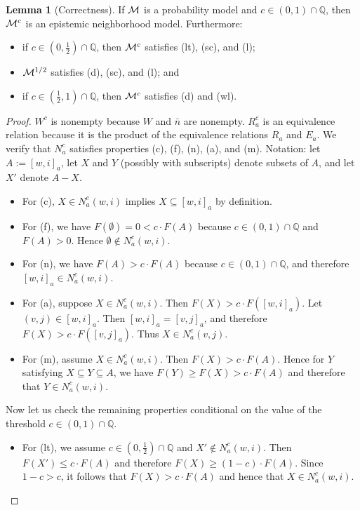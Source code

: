\documentclass[12pt]{article}
\theoremstyle{definition}
\newtheorem{lemma}[theorem]{Lemma}
\newcommand{\Rat}{\mathbb{Q}}  %
\newcommand{\M}{{\cal M}}      %
\begin{document}
\begin{lemma}[Correctness]
  \label{lemma:correctness}
  If $\M$ is a probability model and $c\in(0,1)\cap\Rat$, then $\M^c$
  is an epistemic neighborhood model.  Furthermore:
  \begin{itemize}
  \item if $c\in(0,\frac 12)\cap\Rat$, then $\M^c$ satisfies (lt),
    (sc), and (l);

  \item $\M^{1/2}$ satisfies (d), (sc), and (l); and

  \item if $c\in(\frac 12,1)\cap\Rat$, then $\M^c$ satisfies (d) and
    (wl).
  \end{itemize}
\end{lemma}
\begin{proof}
  $W^c$ is nonempty because $W$ and $\bar{n}$ are nonempty.  $R^c_a$
  is an equivalence relation because it is the product of the
  equivalence relations $R_a$ and $E_a$.  We verify that $N^c_a$
  satisfies properties (c), (f), (n), (a), and (m).  Notation: let
  $A:=[w,i]_a$, let $X$ and $Y$ (possibly with subscripts) denote
  subsets of $A$, and let $X'$ denote $A-X$.
  \begin{itemize}
  \item For (c), $X\in N^c_a(w,i)$ implies $X\subseteq[w,i]_a$ by
    definition.

  \item For (f), we have $F(\emptyset)=0<c\cdot F(A)$ because
    $c\in(0,1)\cap\Rat$ and $F(A)>0$.  Hence $\emptyset\notin
    N^c_a(w,i)$.

  \item For (n), we have $F(A) > c\cdot F(A)$ because
    $c\in(0,1)\cap\Rat$, and therefore $[w,i]_a \in N^c_a(w,i)$.

  \item For (a), suppose $X \in N^c_a(w,i)$. Then $F(X) > c\cdot
    F([w,i]_a)$.  Let $(v,j) \in [w,i]_a$. Then $[w,i]_a = [v,j]_a$,
    and therefore $F(X) > c\cdot F([v,j]_a)$. Thus $X \in N^c_a(v,j)$.

  \item For (m), assume $X \in N^c_a(w,i)$.  Then $F(X) > c\cdot
    F(A)$. Hence for $Y$ satisfying $X \subseteq Y \subseteq A$, we
    have $F(Y) \geq F(X) > c\cdot F(A)$ and therefore that $Y \in
    N^c_a(w,i)$.
  \end{itemize}
  Now let us check the remaining properties conditional on the value
  of the threshold $c\in(0,1)\cap\Rat$.
  \begin{itemize}
  \item For (lt), we assume $c\in(0,\frac 12)\cap\Rat$ and $X'\notin
    N^c_a(w,i)$.  Then $F(X')\leq c\cdot F(A)$ and therefore $F(X)\geq
    (1-c)\cdot F(A)$.  Since $1-c>c$, it follows that $F(X)> c\cdot
    F(A)$ and hence that $X\in N^c_a(w,i)$.


\end{itemize}
\end{proof}
\end{document}

